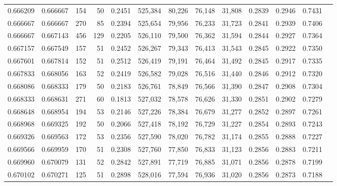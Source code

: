 \begin{tabular}{rrrrrrrrrrrrr}
0.666209 & 0.666667 &    154 &    50 &                                     0.2451 & 525,384 &  80,226 &  76,148 &  31,808 & 0.2839 & 0.2946 & 0.7431 \\
0.666667 & 0.666667 &    270 &    85 &                                     0.2394 & 525,654 &  79,956 &  76,233 &  31,723 & 0.2841 & 0.2939 & 0.7406 \\
0.666667 & 0.667143 &    456 &   129 &                                     0.2205 & 526,110 &  79,500 &  76,362 &  31,594 & 0.2844 & 0.2927 & 0.7364 \\
0.667157 & 0.667549 &    157 &    51 &                                     0.2452 & 526,267 &  79,343 &  76,413 &  31,543 & 0.2845 & 0.2922 & 0.7350 \\
0.667601 & 0.667814 &    152 &    51 &                                     0.2512 & 526,419 &  79,191 &  76,464 &  31,492 & 0.2845 & 0.2917 & 0.7335 \\
0.667833 & 0.668056 &    163 &    52 &                                     0.2419 & 526,582 &  79,028 &  76,516 &  31,440 & 0.2846 & 0.2912 & 0.7320 \\
0.668086 & 0.668333 &    179 &    50 &                                     0.2183 & 526,761 &  78,849 &  76,566 &  31,390 & 0.2847 & 0.2908 & 0.7304 \\
0.668333 & 0.668631 &    271 &    60 &                                     0.1813 & 527,032 &  78,578 &  76,626 &  31,330 & 0.2851 & 0.2902 & 0.7279 \\
0.668648 & 0.668954 &    194 &    53 &                                     0.2146 & 527,226 &  78,384 &  76,679 &  31,277 & 0.2852 & 0.2897 & 0.7261 \\
0.668968 & 0.669325 &    192 &    50 &                                     0.2066 & 527,418 &  78,192 &  76,729 &  31,227 & 0.2854 & 0.2893 & 0.7243 \\
0.669326 & 0.669563 &    172 &    53 &                                     0.2356 & 527,590 &  78,020 &  76,782 &  31,174 & 0.2855 & 0.2888 & 0.7227 \\
0.669566 & 0.669959 &    170 &    51 &                                     0.2308 & 527,760 &  77,850 &  76,833 &  31,123 & 0.2856 & 0.2883 & 0.7211 \\
0.669960 & 0.670079 &    131 &    52 &                                     0.2842 & 527,891 &  77,719 &  76,885 &  31,071 & 0.2856 & 0.2878 & 0.7199 \\
0.670102 & 0.670271 &    125 &    51 &                                     0.2898 & 528,016 &  77,594 &  76,936 &  31,020 & 0.2856 & 0.2873 & 0.7188 \\

\end{tabular}
